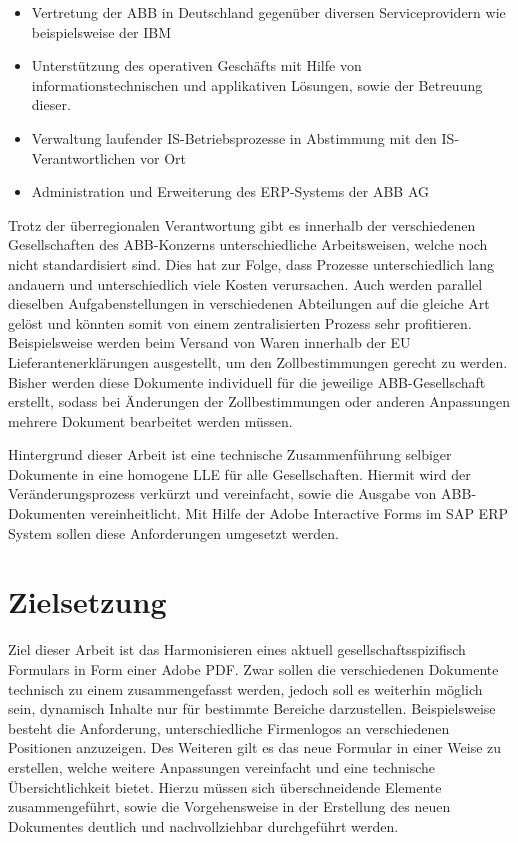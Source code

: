 \begin{itemize}
	\item Vertretung der ABB in Deutschland gegenüber diversen Serviceprovidern wie beispielsweise der IBM
	\item Unterstützung des operativen Geschäfts mit Hilfe von informationstechnischen und applikativen  Lösungen, sowie der Betreuung dieser.
	\item Verwaltung laufender IS-Betriebsprozesse in Abstimmung mit den IS-Verantwortlichen vor Ort
	\item Administration und Erweiterung des \ac{ERP}-Systems der ABB AG
\end{itemize}


 Trotz der überregionalen Verantwortung gibt es innerhalb der verschiedenen Gesellschaften des ABB-Konzerns unterschiedliche Arbeitsweisen, welche noch nicht standardisiert sind. Dies hat zur Folge, dass Prozesse unterschiedlich lang andauern und unterschiedlich viele Kosten verursachen. Auch werden parallel dieselben Aufgabenstellungen in verschiedenen Abteilungen auf die gleiche Art gelöst und könnten somit von einem zentralisierten Prozess sehr profitieren. Beispielsweise werden beim Versand von Waren innerhalb der \ac{EU} Lieferantenerklärungen ausgestellt, um den Zollbestimmungen gerecht zu werden. Bisher werden diese Dokumente individuell für die jeweilige ABB-Gesellschaft erstellt, sodass bei Änderungen der Zollbestimmungen oder anderen Anpassungen mehrere Dokument bearbeitet werden müssen.
 
 Hintergrund dieser Arbeit ist eine technische Zusammenführung selbiger Dokumente in eine homogene \acf{LLE} für alle Gesellschaften. Hiermit wird der Veränderungsprozess verkürzt und vereinfacht, sowie die Ausgabe von ABB-Dokumenten vereinheitlicht. Mit Hilfe der Adobe Interactive Forms im SAP ERP System sollen diese Anforderungen umgesetzt werden.

\section{Zielsetzung}

Ziel dieser Arbeit ist das Harmonisieren eines aktuell gesellschaftsspizifisch Formulars in Form einer Adobe \ac{PDF}. Zwar sollen die verschiedenen Dokumente technisch zu einem zusammengefasst werden, jedoch soll es weiterhin möglich sein, dynamisch Inhalte nur für bestimmte Bereiche darzustellen. Beispielsweise besteht die Anforderung, unterschiedliche Firmenlogos an verschiedenen Positionen anzuzeigen. Des Weiteren gilt es das neue Formular in einer Weise zu erstellen, welche weitere Anpassungen vereinfacht und eine technische Übersichtlichkeit bietet.
Hierzu müssen sich überschneidende Elemente zusammengeführt, sowie die Vorgehensweise in der Erstellung des neuen Dokumentes deutlich und nachvollziehbar durchgeführt werden.

